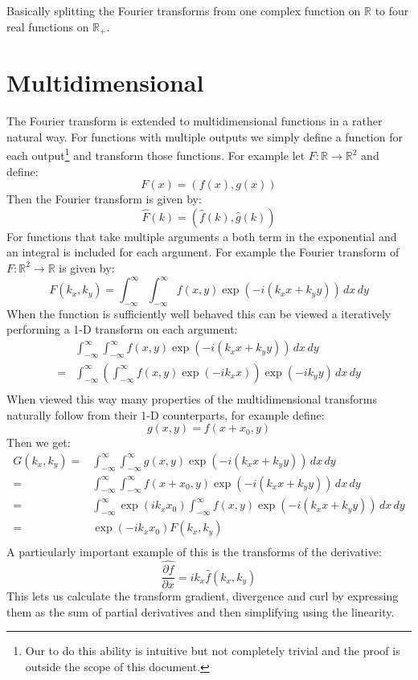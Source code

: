 Basically splitting the Fourier transforms from one complex function on $\mathbb{R}$ to four real functions on $\mathbb{R}_+$.

\section{Multidimensional}
The Fourier transform is extended to multidimensional functions in a rather natural way.
For functions with multiple outputs we simply define a function for each output\footnote{Our to do this ability is intuitive but not completely trivial and the proof is outside the scope of this document.} and transform those functions.
For example let $F:\mathbb{R}\rightarrow\mathbb{R}^2$ and define:
\[F(x) = (f(x),g(x))\]
Then the Fourier transform is given by:
\[\hat{F}(k) = (\hat{f}(k),\hat{g}(k))\]
For functions that take multiple arguments a both term in the exponential and an integral is included for each argument.
For example the Fourier transform of $F:\mathbb{R}^2\rightarrow \mathbb{R}$ is given by:
\[F(k_x,k_y) = \int_{-\infty}^{\infty}\int_{-\infty}^{\infty}f(x,y)\exp(-i(k_x x + k_y y))\,dx\,dy\]
When the function is sufficiently well behaved this can be viewed a iteratively performing a 1-D transform on each argument: 
\[\begin{aligned}
 &\int_{-\infty}^{\infty}\int_{-\infty}^{\infty}f(x,y)\exp(-i(k_x x + k_y y))\,dx\,dy\\
=&\int_{-\infty}^{\infty}\left(\int_{-\infty}^{\infty}f(x,y)\exp(-ik_x x)\right) \exp(-ik_y y)\,dx\,dy\\
\end{aligned}\]
When viewed this way many properties of the multidimensional transforms naturally follow from their 1-D counterparts,
for example define:
\[g(x,y) = f(x+x_0,y)\]
Then we get:
\[\begin{aligned}
	G(k_x,k_y)=&\int_{-\infty}^{\infty}\int_{-\infty}^{\infty}g(x,y)\exp(-i(k_x x + k_y y))\,dx\,dy\\
	=&\int_{-\infty}^{\infty}\int_{-\infty}^{\infty}f(x+x_0,y)\exp(-i(k_x x + k_y y))\,dx\,dy\\
	=&\int_{-\infty}^{\infty}\exp(ik_xx_0)\int_{-\infty}^{\infty}f(x,y)\exp(-i(k_x x + k_y y))\,dx\,dy\\
	=&\exp(-ik_xx_0)F(k_x,k_y)\\
\end{aligned}\]
A particularly important example of this is the transforms of the derivative:
\[\widehat{\frac{\partial f}{\partial x}} = ik_x\hat{f}(k_x,k_y)\]
This lets us calculate the transform gradient, divergence and curl by expressing them as the sum of partial derivatives and then simplifying using the linearity.
